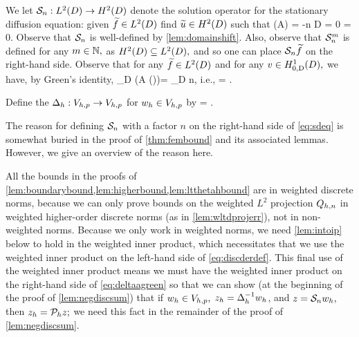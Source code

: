 We let $\DeltaAI:\LtD\rightarrow\HtD$ denote the solution operator for the stationary diffusion equation: given $\ftilde \in \LtD$ find $\utilde \in \HtD$ such that
\beq\label{eq:sdeq}
\grad \cdot \mleft(A\grad \utilde\mright) = -n\ftilde {} D
\eeq
\beq\label{eq:sddbc}
\trD \utilde = 0
\eeq
\beq\label{eq:sdnbc}
\dn \utilde = 0.
\eeq
Observe that $\mathcal S_{n}$ is well-defined by \cref{lem:domainshift}. Also, observe that $\mathcal S_{n}^{m}$ is defined for any $m \in \mathbb N,$ as $\HtD \subseteq \LtD,$ and so one can place $\mathcal S_{n} \widetilde{f}$ on the right-hand side. 
Observe that for any $\ftilde \in \LtD$ and for any $v \in \HozDD,$ we have, by Green's identity,
\beqs
\int_D \mleft(A \grad \mleft(\DeltaAI\ftilde\mright)\mright)\cdot \grad \vb = \int_D n\ftilde \vb,
\eeqs
i.e.,
\beq\label{eq:deltaagreen}
 = .
\eeq


Define the  $\Delta_{h}:V_{h,p}\rightarrow V_{h,p}$ for $w_{h} \in V_{h,p}$ by
\beq\label{eq:discderdef}
\IPLtDn{\Deltah \wh}{\vh} =  \tforall \vh \in \Vhp.
\eeq
\ede

The reason for defining $\mathcal S_{n}$ with a factor $n$ on the right-hand side of \cref{eq:sdeq} is somewhat buried in the proof of \cref{thm:fembound} and its associated lemmas. However, we give an overview of the reason here.

All the bounds in the proofs of \cref{lem:boundarybound,lem:higherbound,lem:ltthetahbound} are in weighted discrete norms, because we can only prove bounds on the weighted $L^2$ projection $Q_{h,n}$ in weighted higher-order discrete norms (as in \cref{lem:wltdprojerr}), not in non-weighted norms. Because we only work in weighted norms, we need \cref{lem:intoip} below to hold in the weighted inner product, which necessitates that we use the weighted inner product on the left-hand side of \cref{eq:discderdef}. This final use of the weighted inner product means we must have the weighted inner product on the right-hand side of \cref{eq:deltaagreen} so that we can show (at the beginning of the proof of \cref{lem:negdiscsum}) that if $w_{h} \in V_{h,p},$ $z_{h} = \Delta_{h}^{-1} w_{h}$, and $z = \mathcal S_{n} w_{h},$ then $z_{h} = \mathcal P_{h} z;$ we need this fact in the remainder of the proof of \cref{lem:negdiscsum}.

